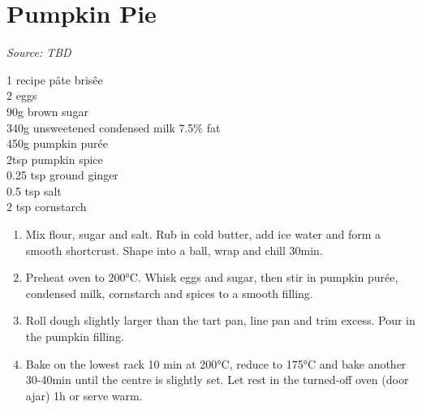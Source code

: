 \documentclass{report}
\begin{document}
\section{Pumpkin Pie}
\textit{Source: TBD}\\
\begin{minipage}[t]{0.21\textwidth} \vspace{0pt} 
1 recipe pâte brisêe\\
2 eggs\\
90g brown sugar\\
340g unsweetened condensed milk 7.5\% fat\\
450g pumpkin purée\\
2tsp pumpkin spice\\
0.25 tsp ground ginger\\
0.5 tsp salt\\
2 tsp cornstarch\\
\end{minipage}
\hfill
\begin{minipage}[t]{0.78\textwidth} \vspace{0pt}
	\begin{enumerate}
		\item Mix flour, sugar and salt. Rub in cold butter, add ice water and form a smooth shortcrust. Shape into a ball, wrap and chill 30min.
		\item Preheat oven to 200°C. Whisk eggs and sugar, then stir in pumpkin purée, condensed milk, cornstarch and spices to a smooth filling.
		\item Roll dough slightly larger than the tart pan, line pan and trim excess. Pour in the pumpkin filling.
		\item Bake on the lowest rack 10 min at 200°C, reduce to 175°C and bake another 30-40min until the centre is slightly set. Let rest in the turned-off oven (door ajar) 1h or serve warm.
	\end{enumerate}	
\end{minipage}
\end{document}
